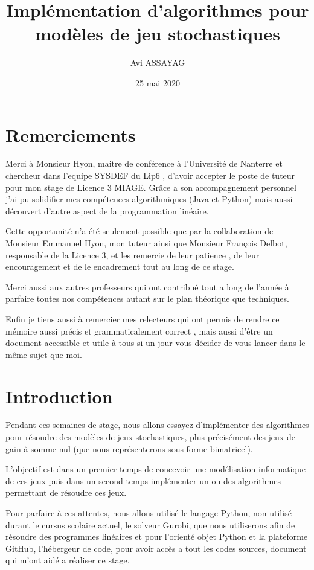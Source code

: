 \documentclass[a4paper, 12pt, twoside]{article}
\author{Avi ASSAYAG}
\title{Implémentation d'algorithmes pour modèles de jeu stochastiques}
\date{25 mai 2020}
\begin{document}
\pagedegarde


\section*{Remerciements}
Merci à Monsieur Hyon, maitre de conférence à l'Université de Nanterre et chercheur dans l'equipe SYSDEF du Lip6 , d'avoir accepter le poste de tuteur pour mon stage de Licence 3 MIAGE. Grâce a son accompagnement personnel j'ai pu solidifier mes compétences algorithmiques (Java et Python) mais aussi découvert d'autre aspect de la programmation linéaire.
\newline 

Cette opportunité n'a été seulement possible que par la collaboration de Monsieur Emmanuel Hyon, mon tuteur ainsi que Monsieur François Delbot, responsable de la Licence 3, et les remercie de leur patience , de leur encouragement et de le encadrement tout au long de ce stage.
\newline

Merci aussi aux autres professeurs qui ont contribué tout a long de l'année à parfaire toutes nos compétences autant sur le plan théorique que techniques. \newline

Enfin je tiens aussi à remercier mes relecteurs qui ont permis de rendre ce mémoire aussi précis et grammaticalement correct  , mais aussi d'être un document accessible et utile à tous si un jour vous décider de vous lancer dans le même sujet que moi.
\newpage

\tableofcontents
\newpage

\section{Introduction}
Pendant ces semaines de stage, nous allons essayez d'implémenter des algorithmes pour résoudre des modèles de jeux stochastiques, plus précisément des jeux  de gain à somme nul (que nous représenterons sous forme bimatricel). \newline

L'objectif est dans un premier temps de concevoir une modélisation informatique de ces jeux puis dans un second temps implémenter un ou des algorithmes permettant de résoudre ces jeux.  \newline

Pour parfaire à ces attentes, nous allons utilisé le langage \textsf{Python}, non utilisé durant le cursus scolaire actuel, le solveur \textsf{Gurobi}, que nous utiliserons afin de résoudre des programmes linéaires et pour l'orienté objet \textsf{Python} et la plateforme \textsf{GitHub}, l'hébergeur de code, pour avoir accès a tout les codes sources, document qui m'ont aidé a réaliser ce stage. \newline
\end{document}
